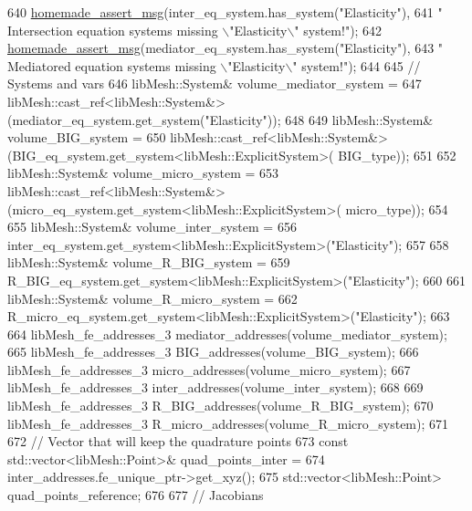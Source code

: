 \begin{DoxyCode}
640         \hyperlink{common__header_8h_a593ccc80b790b2268653fcf6597bf451}{homemade\_assert\_msg}(inter\_eq\_system.has\_system(\textcolor{stringliteral}{"Elasticity"}),
641                 \textcolor{stringliteral}{" Intersection equation systems missing \(\backslash\)"Elasticity\(\backslash\)" system!"});
642         \hyperlink{common__header_8h_a593ccc80b790b2268653fcf6597bf451}{homemade\_assert\_msg}(mediator\_eq\_system.has\_system(\textcolor{stringliteral}{"Elasticity"}),
643                 \textcolor{stringliteral}{" Mediatored equation systems missing \(\backslash\)"Elasticity\(\backslash\)" system!"});
644 
645         \textcolor{comment}{// Systems and vars}
646         libMesh::System& volume\_mediator\_system =
647                 libMesh::cast\_ref<libMesh::System&>(mediator\_eq\_system.get\_system(\textcolor{stringliteral}{"Elasticity"}));
648 
649         libMesh::System& volume\_BIG\_system =
650                 libMesh::cast\_ref<libMesh::System&>(BIG\_eq\_system.get\_system<libMesh::ExplicitSystem>(
      BIG\_type));
651 
652         libMesh::System& volume\_micro\_system =
653                 libMesh::cast\_ref<libMesh::System&>(micro\_eq\_system.get\_system<libMesh::ExplicitSystem>(
      micro\_type));
654 
655         libMesh::System& volume\_inter\_system =
656                 inter\_eq\_system.get\_system<libMesh::ExplicitSystem>(\textcolor{stringliteral}{"Elasticity"});
657 
658         libMesh::System& volume\_R\_BIG\_system =
659                 R\_BIG\_eq\_system.get\_system<libMesh::ExplicitSystem>(\textcolor{stringliteral}{"Elasticity"});
660 
661         libMesh::System& volume\_R\_micro\_system =
662                 R\_micro\_eq\_system.get\_system<libMesh::ExplicitSystem>(\textcolor{stringliteral}{"Elasticity"});
663 
664         libMesh\_fe\_addresses\_3 mediator\_addresses(volume\_mediator\_system);
665         libMesh\_fe\_addresses\_3 BIG\_addresses(volume\_BIG\_system);
666         libMesh\_fe\_addresses\_3 micro\_addresses(volume\_micro\_system);
667         libMesh\_fe\_addresses\_3 inter\_addresses(volume\_inter\_system);
668 
669         libMesh\_fe\_addresses\_3 R\_BIG\_addresses(volume\_R\_BIG\_system);
670         libMesh\_fe\_addresses\_3 R\_micro\_addresses(volume\_R\_micro\_system);
671 
672         \textcolor{comment}{// Vector that will keep the quadrature points}
673         \textcolor{keyword}{const} std::vector<libMesh::Point>& quad\_points\_inter =
674                 inter\_addresses.fe\_unique\_ptr->get\_xyz();
675         std::vector<libMesh::Point> quad\_points\_reference;
676 
677         \textcolor{comment}{// Jacobians}

\end{DoxyCode}
